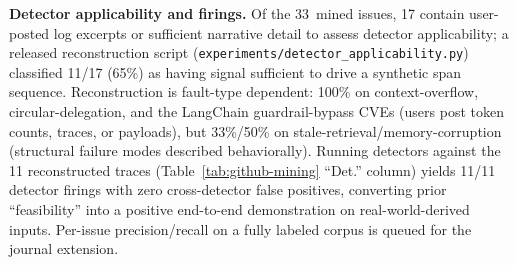 \documentclass[sigconf,screen]{acmart}
\begin{document}
\textbf{Detector applicability and firings.}
Of the 33~mined issues, 17 contain user-posted log excerpts or
sufficient narrative detail to assess detector applicability; a
released reconstruction script
(\texttt{experiments/detector\_applicability.py}) classified 11/17
(65\%) as having signal sufficient to drive a synthetic span sequence.
Reconstruction is fault-type dependent: 100\% on context-overflow,
circular-delegation, and the LangChain guardrail-bypass CVEs (users
post token counts, traces, or payloads), but 33\%/50\% on
stale-retrieval/memory-corruption (structural failure modes described
behaviorally).  Running detectors against the 11 reconstructed traces
(Table~\ref{tab:github-mining} ``Det.'' column) yields 11/11 detector firings with
zero cross-detector false positives, converting prior ``feasibility''
into a positive end-to-end demonstration on real-world-derived inputs.
Per-issue precision/recall on a fully labeled corpus is queued for the
journal extension.
\end{document}
